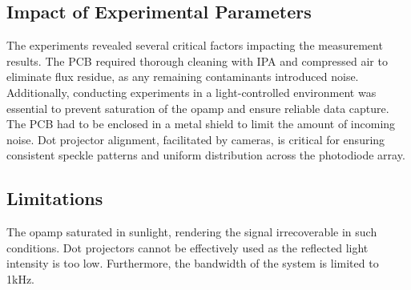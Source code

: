\subsection{Impact of Experimental Parameters}

The experiments revealed several critical factors impacting the measurement results. 
The PCB required thorough cleaning with IPA and compressed air to eliminate flux residue, as any remaining contaminants introduced noise. 
Additionally, conducting experiments in a light-controlled environment was essential to prevent saturation of the opamp and ensure reliable data capture. 
The PCB had to be enclosed in a metal shield to limit the amount of incoming noise.
Dot projector alignment, facilitated by cameras, is critical for ensuring consistent speckle patterns and uniform distribution across the photodiode array.

\subsection{Limitations}
The opamp saturated in sunlight, rendering the signal irrecoverable in such conditions. Dot projectors cannot be effectively used as the reflected light intensity is too low.
Furthermore, the bandwidth of the system is limited to 1kHz.
